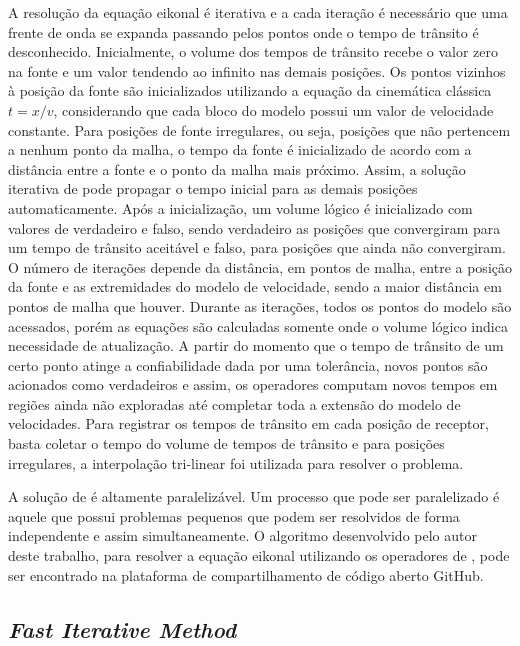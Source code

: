 A resolução da equação eikonal é iterativa e a cada iteração é necessário que uma frente de onda se expanda passando pelos pontos onde o tempo de trânsito é desconhecido. Inicialmente, o volume dos tempos de trânsito recebe o valor zero na fonte e um valor tendendo ao infinito nas demais posições. Os pontos vizinhos à posição da fonte são inicializados utilizando a equação da cinemática clássica $t = x / v$, considerando que cada bloco do modelo possui um valor de velocidade constante. Para posições de fonte irregulares, ou seja, posições que não pertencem a nenhum ponto da malha, o tempo da fonte é inicializado de acordo com a distância entre a fonte e o ponto da malha mais próximo. Assim, a solução iterativa de  pode propagar o tempo inicial para as demais posições automaticamente. Após a inicialização, um volume lógico é inicializado com valores de verdadeiro e falso, sendo verdadeiro as posições que convergiram para um tempo de trânsito aceitável e falso, para posições que ainda não convergiram. O número de iterações depende da distância, em pontos de malha, entre a posição da fonte e as extremidades do modelo de velocidade, sendo a maior distância em pontos de malha que houver. Durante as iterações, todos os pontos do modelo são acessados, porém as equações são calculadas somente onde o volume lógico indica necessidade de atualização. A partir do momento que o tempo de trânsito de um certo ponto atinge a confiabilidade dada por uma tolerância, novos pontos são acionados como verdadeiros e assim, os operadores computam novos tempos em regiões ainda não exploradas até completar toda a extensão do modelo de velocidades. Para registrar os tempos de trânsito em cada posição de receptor, basta coletar o tempo do volume de tempos de trânsito e para posições irregulares, a interpolação tri-linear foi utilizada para resolver o problema.  

A solução de  é altamente paralelizável. Um processo que pode ser paralelizado é aquele que possui problemas pequenos que podem ser resolvidos de forma independente e assim simultaneamente. O algoritmo desenvolvido pelo autor deste trabalho, para resolver a equação eikonal utilizando os operadores de , pode ser encontrado na plataforma de compartilhamento de código aberto GitHub.  

\subsection*{\textit{Fast Iterative Method}}

